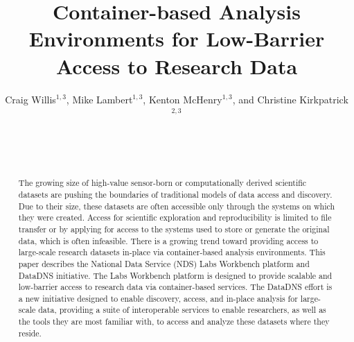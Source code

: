 \documentclass{sig-alternate}
\begin{document}
\sloppy
{}

\author{
Craig Willis$^{1,3}$, Mike Lambert$^{1,3}$, Kenton McHenry$^{1,3}$, and Christine Kirkpatrick$^{2,3}$\\
     \\     
     \\     
     \\     
}
\CopyrightYear{}
\crdata{}
\permission{}
\copyrightetc{}
\conferenceinfo{}{}

\title{Container-based Analysis Environments for Low-Barrier Access to Research Data}

\maketitle
\begin{abstract}

The growing size of high-value sensor-born or computationally derived scientific datasets are pushing the boundaries of traditional models of data access and discovery. Due to their size, these datasets are often accessible only through the systems on which they were created. Access for scientific exploration and reproducibility is limited to file transfer or by applying for access to the systems used to store or generate the original data, which is often infeasible. There is a growing trend toward providing access to large-scale research datasets in-place via container-based analysis environments. This paper describes the National Data Service (NDS) Labs Workbench platform and DataDNS initiative. The Labs Workbench platform is designed to provide scalable and low-barrier access to research data via container-based services. The DataDNS effort is a new initiative designed to enable discovery, access, and in-place analysis for large-scale data, providing a suite of interoperable services to enable researchers, as well as the tools they are most familiar with, to access and analyze these datasets where they reside.

\end{abstract}

\end{document}
